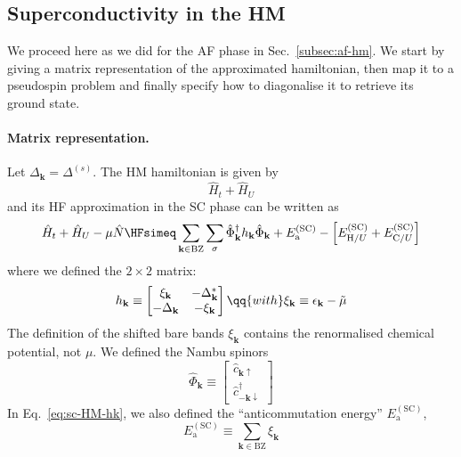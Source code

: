 \subsection{Superconductivity in the HM}\label{subsec:sc-hm}

We proceed here as we did for the AF phase in Sec.~\ref{subsec:af-hm}. We start by giving a matrix representation of the approximated hamiltonian, then map it to a pseudospin problem and finally specify how to diagonalise it to retrieve its ground state.

\paragraph{Matrix representation.}

Let $\Delta_\mathbf{k} = \Delta^{(s)}$. The HM hamiltonian is given by
\[
	\hat H_t + \hat H_U
\]
and its HF approximation in the SC phase can be written as
\begin{equation}\label{eq:sc-HM-hk}
	\hat H_t + \hat H_U - \mu \hat N \HFsimeq \sum_{\mathbf{k} \in \mathrm{BZ}} \sum_\sigma \hat \Phi_\mathbf{k}^\dagger h_\mathbf{k} \hat \Phi_\mathbf{k} + E_\mathrm{a}^{(\mathrm{SC})} - \left[
	E_{\mathrm{H}/U}^{(\mathrm{SC})} + E_{\mathrm{C}/U}^{(\mathrm{SC})}
	\right]
\end{equation}
where we defined the $2 \times 2$ matrix:
\begin{equation}\label{eq:sc-hk}
	h_\mathbf{k} \equiv \begin{bmatrix}
		\xi_\mathbf{k} & -\Delta_\mathbf{k}^* \\
		-\Delta_\mathbf{k} & - \xi_\mathbf{k}
	\end{bmatrix}
	\qq{with}
	\xi_\mathbf{k} \equiv \epsilon_\mathbf{k} - \tilde{\mu}
\end{equation}
The definition of the shifted bare bands $\xi_\mathbf{k}$ contains the renormalised chemical potential, not $\mu$. We defined the Nambu spinors
\begin{equation}\label{eq:sc-Phi-def}
	\hat \Phi_\mathbf{k} \equiv \begin{bmatrix}
		\hat c_{\mathbf{k}\uparrow} \\
		\hat c_{-\mathbf{k}\downarrow}^\dagger
	\end{bmatrix}
\end{equation}
In Eq.~\eqref{eq:sc-HM-hk}, we also defined the ``anticommutation energy'' $E_\mathrm{a}^{(\mathrm{SC})}$,
\begin{equation}\label{eq:sc-anticommutation-energy}
	E_\mathrm{a}^{(\mathrm{SC})} \equiv \sum_{\mathbf{k}\in\mathrm{BZ}} \xi_\mathbf{k}
\end{equation}

